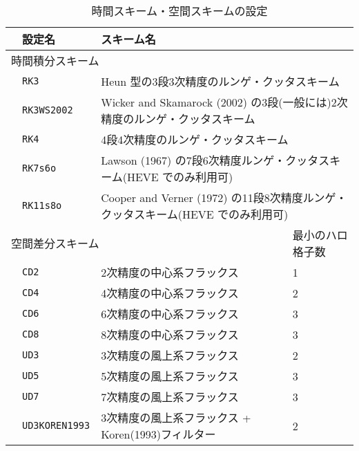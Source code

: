 \begin{table}[h]
\begin{center}
  \caption{時間スキーム・空間スキームの設定}
  \label{tab:nml_atm_dyn}
  \begin{tabularx}{150mm}{llXX} \hline
    \rowcolor[gray]{0.9} & \multicolumn{1}{l}{設定名} & \multicolumn{1}{l}{スキーム名} & \\ \hline
    \multicolumn{3}{l}{時間積分スキーム} &  \\ \hline
    & \multicolumn{1}{l}{\verb|RK3|} & \multicolumn{2}{l}{Heun 型の3段3次精度のルンゲ・クッタスキーム} \\
    & \multicolumn{1}{l}{\verb|RK3WS2002|} & \multicolumn{2}{l}{Wicker and Skamarock (2002) の3段(一般には)2次精度のルンゲ・クッタスキーム} \\
    & \multicolumn{1}{l}{\verb|RK4|} & \multicolumn{2}{l}{4段4次精度のルンゲ・クッタスキーム} \\
    & \multicolumn{1}{l}{\verb|RK7s6o|} & \multicolumn{2}{l}{Lawson (1967) の7段6次精度ルンゲ・クッタスキーム(HEVE でのみ利用可)} \\
    & \multicolumn{1}{l}{\verb|RK11s8o|} & \multicolumn{2}{l}{Cooper and Verner (1972) の11段8次精度ルンゲ・クッタスキーム(HEVE でのみ利用可)} \\
    \hline
    \multicolumn{3}{l}{空間差分スキーム} & 最小のハロ格子数\\ \hline
    & \multicolumn{1}{l}{\verb|CD2|} & \multicolumn{1}{l}{2次精度の中心系フラックス} & \multicolumn{1}{l}{1}\\
    & \multicolumn{1}{l}{\verb|CD4|} & \multicolumn{1}{l}{4次精度の中心系フラックス} & \multicolumn{1}{l}{2}\\
    & \multicolumn{1}{l}{\verb|CD6|} & \multicolumn{1}{l}{6次精度の中心系フラックス} & \multicolumn{1}{l}{3}\\
    & \multicolumn{1}{l}{\verb|CD8|} & \multicolumn{1}{l}{8次精度の中心系フラックス} & \multicolumn{1}{l}{3}\\
    & \multicolumn{1}{l}{\verb|UD3|} & \multicolumn{1}{l}{3次精度の風上系フラックス} & \multicolumn{1}{l}{2}\\
    & \multicolumn{1}{l}{\verb|UD5|} & \multicolumn{1}{l}{5次精度の風上系フラックス} & \multicolumn{1}{l}{3}\\
    & \multicolumn{1}{l}{\verb|UD7|} & \multicolumn{1}{l}{7次精度の風上系フラックス} & \multicolumn{1}{l}{3}\\
    & \multicolumn{1}{l}{\verb|UD3KOREN1993|} & \multicolumn{1}{X}{3次精度の風上系フラックス + Koren(1993)フィルター} & \multicolumn{1}{l}{2}\\
\hline
  \end{tabularx}
\end{center}
\end{table}

